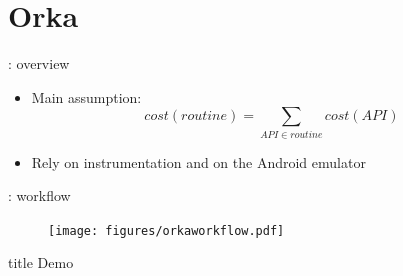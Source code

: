 \section{Orka}
\begin{frame}{\orka{}: overview}
\begin{itemize}
\item Main assumption:
$$ cost(routine) = \sum_{API \in routine} cost(API)$$
\item Rely on \alert{instrumentation} and on the Android emulator
\end{itemize}
\end{frame}
%
%
\begin{frame}{\orka{}: workflow}
\begin{figure}
        \texttt{[image: figures/orkaworkflow.pdf]}
\end{figure}
\end{frame}
%
%
\begin{frame}
  \vfill
  \centering
  \begin{beamercolorbox}[sep=8pt,center,shadow=true,rounded=true]{title}
    Demo\par%
  \end{beamercolorbox}
  \vfill
{}
\end{frame}
%
